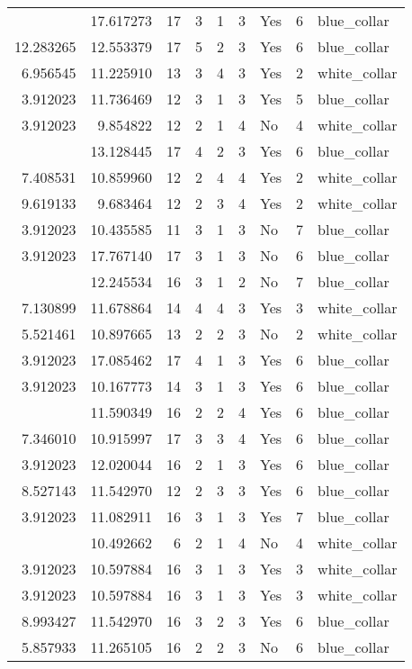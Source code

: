 \documentclass[
]{article}
\begin{document}
\begin{longtable}[t]{rrrrrllrl}
\addlinespace
3.912023 & 17.617273 & 17 & 3 & 1 & 3 & Yes & 6 & blue\_collar\\
12.283265 & 12.553379 & 17 & 5 & 2 & 3 & Yes & 6 & blue\_collar\\
6.956545 & 11.225910 & 13 & 3 & 4 & 3 & Yes & 2 & white\_collar\\
3.912023 & 11.736469 & 12 & 3 & 1 & 3 & Yes & 5 & blue\_collar\\
3.912023 & 9.854822 & 12 & 2 & 1 & 4 & No & 4 & white\_collar\\
\addlinespace
11.736469 & 13.128445 & 17 & 4 & 2 & 3 & Yes & 6 & blue\_collar\\
7.408531 & 10.859960 & 12 & 2 & 4 & 4 & Yes & 2 & white\_collar\\
9.619133 & 9.683464 & 12 & 2 & 3 & 4 & Yes & 2 & white\_collar\\
3.912023 & 10.435585 & 11 & 3 & 1 & 3 & No & 7 & blue\_collar\\
3.912023 & 17.767140 & 17 & 3 & 1 & 3 & No & 6 & blue\_collar\\
\addlinespace
3.912023 & 12.245534 & 16 & 3 & 1 & 2 & No & 7 & blue\_collar\\
7.130899 & 11.678864 & 14 & 4 & 4 & 3 & Yes & 3 & white\_collar\\
5.521461 & 10.897665 & 13 & 2 & 2 & 3 & No & 2 & white\_collar\\
3.912023 & 17.085462 & 17 & 4 & 1 & 3 & Yes & 6 & blue\_collar\\
3.912023 & 10.167773 & 14 & 3 & 1 & 3 & Yes & 6 & blue\_collar\\
\addlinespace
12.638017 & 11.590349 & 16 & 2 & 2 & 4 & Yes & 6 & blue\_collar\\
7.346010 & 10.915997 & 17 & 3 & 3 & 4 & Yes & 6 & blue\_collar\\
3.912023 & 12.020044 & 16 & 2 & 1 & 3 & Yes & 6 & blue\_collar\\
8.527143 & 11.542970 & 12 & 2 & 3 & 3 & Yes & 6 & blue\_collar\\
3.912023 & 11.082911 & 16 & 3 & 1 & 3 & Yes & 7 & blue\_collar\\
\addlinespace
3.912023 & 10.492662 & 6 & 2 & 1 & 4 & No & 4 & white\_collar\\
3.912023 & 10.597884 & 16 & 3 & 1 & 3 & Yes & 3 & white\_collar\\
3.912023 & 10.597884 & 16 & 3 & 1 & 3 & Yes & 3 & white\_collar\\
8.993427 & 11.542970 & 16 & 3 & 2 & 3 & Yes & 6 & blue\_collar\\
5.857933 & 11.265105 & 16 & 2 & 2 & 3 & No & 6 & blue\_collar\\

\end{longtable}
\end{document}
